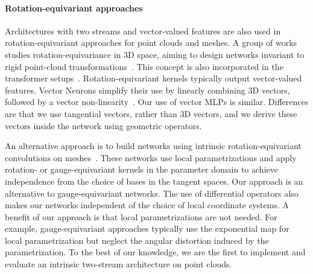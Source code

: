 \documentclass[acmtog, authorversion]{acmart}
\begin{document}
\paragraph*{Rotation-equivariant approaches}
Architectures with two streams and vector-valued features are also used in rotation-equivariant approaches for point clouds and meshes. A group of works studies rotation-equivariance in 3D space, aiming to design networks invariant to rigid point-cloud transformations~\cite{Esteves2017, Thomas2018, Cohen2018, Poulenard2019SPHNet}. This concept is also incorporated in the transformer setups~\cite{fuchs2020se3transformer}. Rotation-equivariant kernels typically output vector-valued features. Vector Neurons simplify their use by linearly combining 3D vectors, followed by a vector non-linearity~\cite{deng2021vectorneurons}. Our use of vector MLPs is similar. Differences are that we use tangential vectors, rather than 3D vectors, and we derive these vectors inside the network using geometric operators.

An alternative approach is to build networks using intrinsic rotation-equivariant convolutions on meshes~\cite{dehaan2020gauge, Wiersma2020, CohenICML2019, Poulenard2018, weiler2021coordinate, gerken2021geometric}. These networks use local parametrizations and apply rotation- or gauge-equivariant kernels in the parameter domain to achieve independence from the choice of bases in the tangent spaces. Our approach is an alternative to gauge-equivariant networks. The use of differential operators also makes our networks independent of the choice of local coordinate systems. A benefit of our approach is that local parametrizations are not needed. 
For example, gauge-equivariant approaches typically use the exponential map for local parametrization but neglect the angular distortion induced by the parametrization.
To the best of our knowledge, we are the first to implement and evaluate an intrinsic two-stream architecture on point clouds.
 
\end{document}
